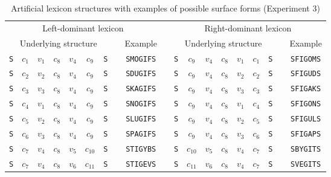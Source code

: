 \documentclass[doc,biblatex]{apa7}
\begin{document}
\begin{table}
\begin{center}
\begin{threeparttable}
\caption{Artificial lexicon structures with examples of possible surface forms (Experiment 3)}
\footnotesize
\label{table2}
\begin{tabular}{ccccccccccccccccccc}
\toprule
\multicolumn{9}{c}{Left-dominant lexicon} & & \multicolumn{9}{c}{Right-dominant lexicon} \\
\multicolumn{7}{c}{Underlying structure} & & Example & & \multicolumn{7}{c}{Underlying structure} & & Example \\
\texttt{S} & $c_1$ & $v_1$ & $c_8$ & $v_4$ & $c_9$ & \texttt{S} & & \texttt{SMOGIFS} & & \texttt{S} & $c_9$ & $v_4$ & $c_8$ & $v_1$ & $c_1$ & \texttt{S} & & \texttt{SFIGOMS} \\
\texttt{S} & $c_2$ & $v_2$ & $c_8$ & $v_4$ & $c_9$ & \texttt{S} & & \texttt{SDUGIFS} & & \texttt{S} & $c_9$ & $v_4$ & $c_8$ & $v_2$ & $c_2$ & \texttt{S} & & \texttt{SFIGUDS} \\
\texttt{S} & $c_3$ & $v_3$ & $c_8$ & $v_4$ & $c_9$ & \texttt{S} & & \texttt{SKAGIFS} & & \texttt{S} & $c_9$ & $v_4$ & $c_8$ & $v_3$ & $c_3$ & \texttt{S} & & \texttt{SFIGAKS} \\
\texttt{S} & $c_4$ & $v_1$ & $c_8$ & $v_4$ & $c_9$ & \texttt{S} & & \texttt{SNOGIFS} & & \texttt{S} & $c_9$ & $v_4$ & $c_8$ & $v_1$ & $c_4$ & \texttt{S} & & \texttt{SFIGONS} \\
\texttt{S} & $c_5$ & $v_2$ & $c_8$ & $v_4$ & $c_9$ & \texttt{S} & & \texttt{SLUGIFS} & & \texttt{S} & $c_9$ & $v_4$ & $c_8$ & $v_2$ & $c_5$ & \texttt{S} & & \texttt{SFIGULS} \\
\texttt{S} & $c_6$ & $v_3$ & $c_8$ & $v_4$ & $c_9$ & \texttt{S} & & \texttt{SPAGIFS} & & \texttt{S} & $c_9$ & $v_4$ & $c_8$ & $v_3$ & $c_6$ & \texttt{S} & & \texttt{SFIGAPS} \\
\texttt{S} & $c_7$ & $v_4$ & $c_8$ & $v_5$ & $c_{10}$ & \texttt{S} & & \texttt{STIGYBS} & & \texttt{S} & $c_{10}$ & $v_5$ & $c_8$ & $v_4$ & $c_7$ & \texttt{S} & & \texttt{SBYGITS} \\
\texttt{S} & $c_7$ & $v_4$ & $c_8$ & $v_6$ & $c_{11}$ & \texttt{S} & & \texttt{STIGEVS} & & \texttt{S} & $c_{11}$ & $v_6$ & $c_8$ & $v_4$ & $c_7$ & \texttt{S} & & \texttt{SVEGITS} \\
\bottomrule
\end{tabular} 
\end{threeparttable}
\end{center} 
\end{table}
\end{document}
